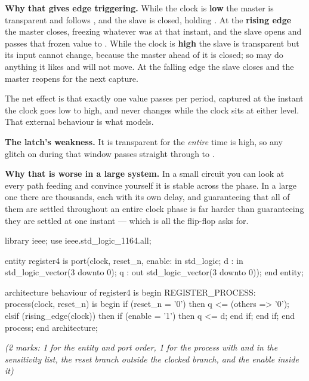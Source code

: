 \textbf{Why that gives edge triggering.} While the clock is \textbf{low} the master is transparent
and follows , and the slave is closed, holding . At the \textbf{rising edge} the
master closes, freezing whatever  was at that instant, and the slave opens and passes that
frozen value to . While the clock is \textbf{high} the slave is transparent but its input
cannot change, because the master ahead of it is closed; so  may do anything it likes and
 will not move. At the falling edge the slave closes and the master reopens for the next
capture.

The net effect is that exactly one value passes per period, captured at the instant the clock goes
low to high, and  never changes while the clock sits at either level. That external
behaviour is what  models. 

\textbf{The latch's weakness.} It is transparent for the \emph{entire} time  is high,
so any glitch on  during that window passes straight through to .

\textbf{Why that is worse in a large system.} In a small circuit you can look at every path feeding
 and convince yourself it is stable across the phase. In a large one there are thousands,
each with its own delay, and guaranteeing that all of them are settled throughout an entire clock
phase is far harder than guaranteeing they are settled at one instant --- which is all the
flip-flop asks for. 

\begin{vhdlcode}
library ieee;
use ieee.std_logic_1164.all;

entity register4 is
    port(clock, reset_n, enable: in  std_logic;
         d                     : in  std_logic_vector(3 downto 0);
         q                     : out std_logic_vector(3 downto 0));
end entity;

architecture behaviour of register4 is
begin
    REGISTER_PROCESS: process(clock, reset_n) is
    begin
        if (reset_n = '0') then
            q <= (others => '0');
        elsif (rising_edge(clock)) then
            if (enable = '1') then
                q <= d;
            end if;
        end if;
    end process;
end architecture;
\end{vhdlcode}

{\itshape (2 marks: 1 for the entity and port order, 1 for the process with  and
 in the sensitivity list, the reset branch outside the clocked branch, and the enable
inside it)\par}

